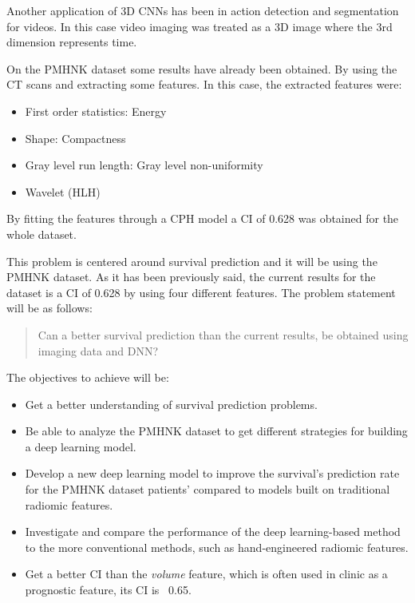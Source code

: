 Another application of 3D \glspl{CNN} has been in action detection and segmentation for videos.
In this case video imaging was treated as a 3D image where the 3rd dimension represents
time.
~\cite{neural:3d-cnn-action-detection}

On the \gls{PMHNK} dataset some results have already been obtained. By using the \gls{CT} scans and
extracting some features. In this case, the extracted features were:
\begin{itemize}
  \item First order statistics: Energy
  \item Shape: Compactness
  \item Gray level run length: Gray level non-uniformity
  \item Wavelet (HLH) 
\end{itemize}
By fitting the features through a \gls{CPH} model a \gls{CI} of 0.628 was obtained for the whole
dataset.
~\cite{medical:ct-based-radiomic-signature}


This problem is centered around survival prediction and it will be using the \gls{PMHNK} dataset. 
As it has been previously said, the current results for the dataset is a \gls{CI}
of 0.628 \cite{medical:ct-based-radiomic-signature} by using four different features.
The problem statement will be as follows:
\begin{quotation}
  Can a better survival prediction than the current results, be obtained using imaging data and
  \gls{DNN}?
\end{quotation}


The objectives to achieve will be:
\begin{itemize}
  \item Get a better understanding of survival prediction problems.
  \item Be able to analyze the \gls{PMHNK} dataset to get different strategies for building a 
  deep learning model.
  \item Develop a new deep learning model to improve the survival's prediction rate for the
  \gls{PMHNK} dataset patients' compared to models built on traditional radiomic features.
  \item Investigate and compare the performance of the deep learning-based method to 
  the more conventional methods, such as hand-engineered radiomic features.
  \item Get a better \gls{CI} than the \emph{volume} feature, which is often used in clinic as a
  prognostic feature, its \gls{CI} is ~0.65.
\end{itemize}

